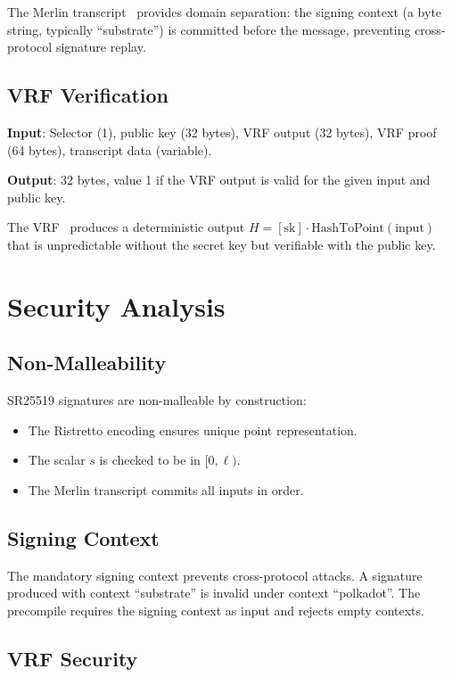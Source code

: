 \documentclass[11pt,a4paper]{article}
\begin{document}
The Merlin transcript~\cite{merlin} provides domain separation: the signing
context (a byte string, typically ``substrate'') is committed before the message,
preventing cross-protocol signature replay.

\subsection{VRF Verification}

\textbf{Input}: Selector (1), public key (32 bytes), VRF output (32 bytes),
VRF proof (64 bytes), transcript data (variable).

\textbf{Output}: 32 bytes, value 1 if the VRF output is valid for the given
input and public key.

The VRF~\cite{vrf-schnorrkel} produces a deterministic output $H = [\text{sk}] \cdot \text{HashToPoint}(\text{input})$
that is unpredictable without the secret key but verifiable with the public key.

\section{Security Analysis}

\subsection{Non-Malleability}

SR25519 signatures are non-malleable by construction:
\begin{itemize}
  \item The Ristretto encoding ensures unique point representation.
  \item The scalar $s$ is checked to be in $[0, \ell)$.
  \item The Merlin transcript commits all inputs in order.
\end{itemize}

\subsection{Signing Context}

The mandatory signing context prevents cross-protocol attacks. A signature
produced with context ``substrate'' is invalid under context ``polkadot''.
The precompile requires the signing context as input and rejects empty contexts.

\subsection{VRF Security}
\end{document}
